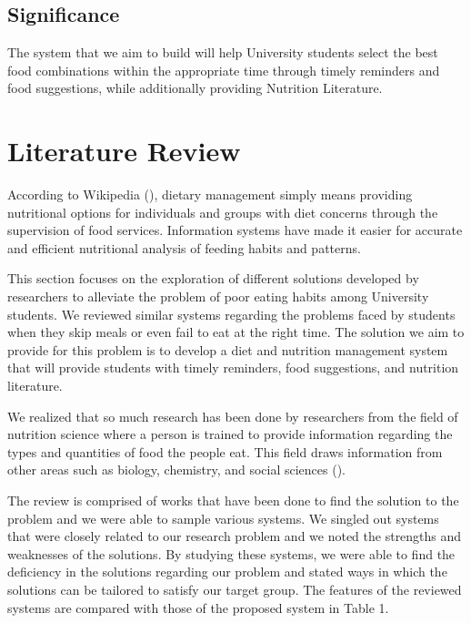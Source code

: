\documentclass{article}
\begin{document}
\subsection{Significance}

The system that we aim to build will help University students select the best food combinations within the appropriate time through timely reminders and food suggestions, while additionally providing Nutrition Literature.


\newpage
\section{Literature Review}

According to Wikipedia (\citeyear{wikipedia2019dietary}), dietary management simply means providing nutritional options for individuals and groups with diet concerns through the supervision of food services. Information systems have made it easier for accurate and efficient nutritional analysis of feeding habits and patterns.

This section focuses on the exploration of different solutions developed by researchers to alleviate the problem of poor eating habits among University students. We reviewed similar systems regarding the problems faced by students when they skip meals or even fail to eat at the right time. The solution we aim to provide for this problem is to develop a diet and nutrition management system that will provide students with timely reminders, food suggestions, and nutrition literature.

We realized that so much research has been done by researchers from the field of nutrition science where a person is trained to provide information regarding the types and quantities of food the people eat. This field draws information from other areas such as biology, chemistry, and social sciences (\cite{sriram2020hire}).

The review is comprised of works that have been done to find the solution to the problem and we were able to sample various systems. We singled out systems that were closely related to our research problem and we noted the strengths and weaknesses of the solutions. By studying these systems, we were able to find the deficiency in the solutions regarding our problem and stated ways in which the solutions can be tailored to satisfy our target group. The features of the reviewed systems are compared with those of the proposed system in Table 1.
\end{document}
